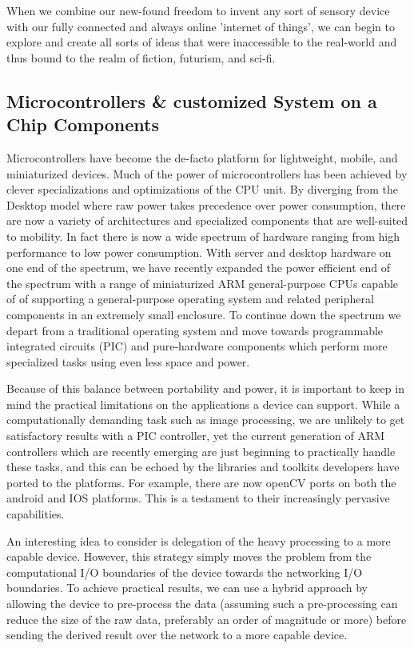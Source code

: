 \documentclass[a4paper,12pt]{report}
\begin{document}
When we combine our new-found freedom to invent any sort of sensory device with our fully connected and always online 'internet of things', we can begin to explore and create all sorts of ideas that were inaccessible to the real-world and thus bound to the realm of fiction, futurism, and sci-fi.
\iffalse
\subsection{Microcontrollers \& customized System on a Chip Components}

Microcontrollers have become the de-facto platform for lightweight, mobile, and miniaturized devices. Much of the power of microcontrollers has been achieved by clever specializations and optimizations of the CPU unit. By diverging from the Desktop model where raw power takes precedence over power consumption, there are now a variety of architectures and specialized components that are well-suited to mobility. In fact there is now a wide spectrum of hardware ranging from high performance to low power consumption. With server and desktop hardware on one end of the spectrum, we have recently expanded the power efficient end of the spectrum with a range of miniaturized ARM general-purpose CPUs capable of of supporting a general-purpose operating system and related peripheral components in an extremely small enclosure. To continue down the spectrum we depart from a traditional operating system and move towards programmable integrated circuits (PIC) and pure-hardware components which perform more specialized tasks using even less space and power.

Because of this balance between portability and power, it is important to keep in mind the practical limitations on the applications a device can support. While a computationally demanding task such as image processing, we are unlikely to get satisfactory results with a PIC controller, yet the current generation of ARM controllers which are recently emerging are just beginning to practically handle these tasks, and this can be echoed by the libraries and toolkits developers have ported to the platforms. For example, there are now openCV ports on both the android and IOS platforms. This is a testament to their increasingly pervasive capabilities.

An interesting idea to consider is delegation of the heavy processing to a more capable device. However, this strategy simply moves the problem from the computational I/O boundaries of the device towards the networking I/O boundaries. To achieve practical results, we can use a hybrid approach by allowing the device to pre-process the data (assuming such a pre-processing can reduce the size of the raw data, preferably an order of magnitude or more) before sending the derived result over the network to a more capable device.
\end{document}
